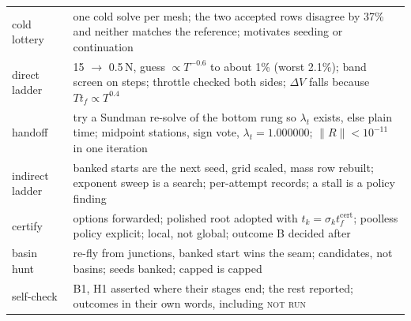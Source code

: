\documentclass[11pt]{article}
\newcommand{\tf}{t_f}\newcommand{\R}{\mathbb{R}}
\begin{document}
\noindent
\begin{tabular}{@{}p{}p{}@{}}
\toprule
cold lottery & one cold solve per mesh; the two accepted rows disagree by 37\% and neither matches the reference; motivates seeding or continuation \\
direct ladder & 15 $\to$ 0.5\,N, guess $\propto T^{-0.6}$ to about 1\% (worst 2.1\%); band screen on steps; throttle checked both sides; $\Delta V$ falls because $T\tf\propto T^{0.4}$ \\
handoff & try a Sundman re-solve of the bottom rung so $\lambda_t$ exists, else plain time; midpoint stations, sign vote, $\lambda_t=1.000000$; $\|R\|<10^{-11}$ in one iteration \\
indirect ladder & banked starts are the next seed, grid scaled, mass row rebuilt; exponent sweep is a search; per-attempt records; a stall is a policy finding \\
certify & options forwarded; polished root adopted with $t_k=\sigma_k t_f^{\mathrm{cert}}$; poolless policy explicit; local, not global; outcome B decided after \\
basin hunt & re-fly from junctions, banked start wins the seam; candidates, not basins; seeds banked; capped is capped \\
self-check & B1, H1 asserted where their stages end; the rest reported; outcomes in their own words, including \textsc{not run} \\
\bottomrule
\end{tabular}
\end{document}
